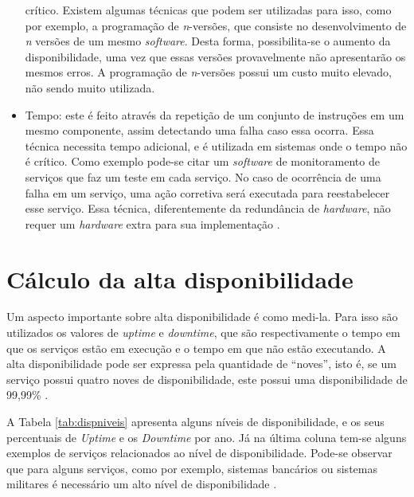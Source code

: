\begin{itemize}
 crítico. Existem algumas técnicas que podem ser utilizadas para isso, como por exemplo, a programação de \textit{n}-versões, que consiste 
 no desenvolvimento de \textit{n} versões de um mesmo \textit{software}. Desta forma, possibilita-se o aumento da disponibilidade, uma vez que 
 essas versões provavelmente não apresentarão os mesmos erros. A programação de \textit{n}-versões possui um custo muito elevado, não sendo muito 
 utilizada.
 \item Tempo: este é feito através da repetição de um conjunto de instruções em um mesmo componente, assim detectando uma falha caso essa ocorra. 
 Essa técnica necessita tempo adicional, e é utilizada em sistemas onde o tempo não é crítico. Como exemplo pode-se citar um \textit{software} 
 de monitoramento de serviços que faz um teste em cada serviço. No caso de ocorrência de uma falha em um serviço, uma ação corretiva 
 será executada para reestabelecer esse serviço. Essa técnica, diferentemente da redundância de \textit{hardware}, não requer um 
 \textit{hardware} extra para sua implementação \cite{costa2009}.
\end{itemize}

\section{Cálculo da alta disponibilidade}

Um aspecto importante sobre alta disponibilidade é como medi-la. Para isso são utilizados os valores de \textit{uptime} e \textit{downtime}, 
que são respectivamente o tempo em que os serviços estão em execução e o tempo em que não estão executando. A alta disponibilidade 
pode ser expressa pela quantidade de ``noves'', isto é, se um serviço possui quatro noves de disponibilidade, este possui uma 
disponibilidade de 99,99\% \cite{pereirafilho2004}.

A Tabela \ref{tab:dispniveis} apresenta alguns níveis de disponibilidade, e os seus percentuais de \textit{Uptime} e os \textit{Downtime} por ano. 
Já na última coluna tem-se alguns exemplos de serviços relacionados ao nível de disponibilidade. Pode-se observar que para alguns serviços, 
como por exemplo, sistemas bancários ou sistemas militares é necessário um alto nível de disponibilidade \cite{pereirafilho2004}.

